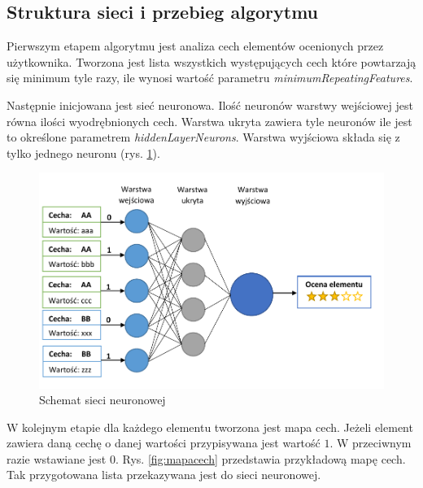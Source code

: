 \documentclass[twoside]{iisthesis}
\begin{document}
	 \subsection{Struktura sieci i przebieg algorytmu}
		 
		 Pierwszym etapem algorytmu jest analiza cech elementów ocenionych przez użytkownika. Tworzona jest lista wszystkich występujących cech które powtarzają się minimum tyle razy, ile wynosi wartość  parametru \textit{minimumRepeatingFeatures}. 
		 
		 Następnie inicjowana jest sieć neuronowa. Ilość neuronów warstwy wejściowej jest równa ilości wyodrębnionych cech. Warstwa ukryta zawiera tyle neuronów ile jest to określone parametrem \textit{hiddenLayerNeurons}. Warstwa wyjściowa składa się z tylko jednego neuronu (rys. \ref{fig:siecneuronowa}). 
		 
		 \begin{figure}%
		 	\centering
		 	\includegraphics[width=1\textwidth]{siecneuronowa}
		 	\caption{Schemat sieci neuronowej}
		 	\label{fig:siecneuronowa}
		 \end{figure}
		 
		 W kolejnym etapie dla każdego elementu tworzona jest mapa cech. Jeżeli element zawiera daną cechę o danej wartości przypisywana jest wartość $1$. W przeciwnym razie wstawiane jest $0$. Rys. \ref{fig:mapacech} przedstawia przykładową mapę cech. Tak przygotowana lista przekazywana jest do sieci neuronowej. 
		 
\end{document}
